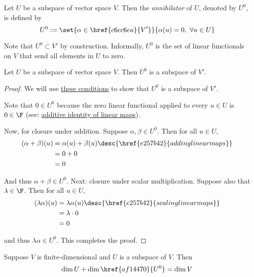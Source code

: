 \label{af14470}

Let $U$ be a subspace of vector space $V$. Then the \textit{annihilator} of
$U$, denoted by $U^0$, is defined by
$$
  U^0:=\set{\alpha\in \href{c6cc6ea}{V'}}{\alpha(u)=0,\ \forall u\in U}
$$

Note that $U^0\subset V'$ by construction. Informally, $U^0$ is the set of
linear functionals on $V$ that send all elements in $U$ to zero.

\label{b53cbdf}

Let $U$ be a subspace of vector space $V$. Then \href{af14470}{$U^0$} is a
subspace of \href{c6cc6ea}{$V'$}.

\begin{proof}
  We will use \href{dea139b}{these conditions} to show that $U^0$ is a subspace
  of $V'$.

  Note that $0\in U^0$ because the zero linear functional applied to every
  $u\in U$ is $0\in\F$ (see: \href{dc79809}{additive identity of linear maps}).

  Now, for closure under addition. Suppose $\alpha,\beta\in U^0$. Then for all
  $u\in U$,
  \begin{align*}
    (\alpha+\beta)(u) &=\alpha(u)+\beta(u)\desc{\href{e257b42}{adding linear maps}} \\
                      &=0+0                                                         \\
                      &=0
  \end{align*}

  And thus $\alpha+\beta\in U^0$. Next: closure under scalar multiplication.
  Suppose also that $\lambda\in\F$. Then for all $u\in U$,
  \begin{align*}
    (\lambda\alpha)(u) &=\lambda\alpha(u)\desc{\href{e257b42}{scaling linear maps}} \\
                       &=\lambda\cdot 0                                             \\
                       &= 0
  \end{align*}

  and thus $\lambda\alpha\in U^0$. This completes the proof.
\end{proof}

\label{cbf151f}

Suppose $V$ is finite-dimensional and $U$ is a subspace of $V$. Then
$$
  \dim U+\dim\href{af14470}{U^0}=\dim V
$$

